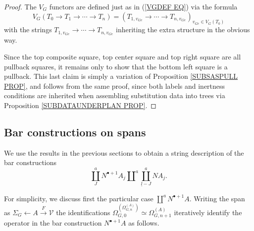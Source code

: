 \documentclass[a4paper,10pt]{article}%
\begin{document}
\begin{proof}
  The $V_G$ functors are defined just as in (\ref{VGDEF EQ}) via the formula
  \[
  V_G(T_0 \to T_1 \to \cdots \to T_n) = 
  (T_{1,v_{Ge}} \to \cdots \to
  T_{n,v_{Ge}})_{v_{Ge} \in V_G(T_0)}\]
  with the strings 
  $T_{1,v_{Ge}} \to \cdots \to T_{n,v_{Ge}}$
  inheriting the extra structure in the obvious way.

  Since the top composite square, top center square and top right square are all pullback squares, it remains only to show that the bottom left square is a pullback.
  This last claim is simply a variation of Proposition \ref{SUBSASPULL PROP}, and follows from the same proof, since both labels and inertness conditions are inherited when assembling substitution data into trees via Proposition \ref{SUBDATAUNDERPLAN PROP}.
\end{proof}


\subsection{Bar constructions on spans}

We use the results in the previous sections to obtain a string description of the bar constructions
\[
\coprod_J^a N^{\bullet +1} A_j \amalg^a
\coprod_{\underline{l}-J}^a N A_j.
\]

For simplicity, we discuss first the particular case 
$\coprod^a N^{\bullet +1} A$. Writing the span as 
$\Sigma_G \leftarrow A \xrightarrow{F} \mathcal{V}$
the identifications 
$\Omega_{G,0}^{\left( \Omega_{G,n}^{(A)} \right)} \simeq \Omega_{G,n+1}^{(A)}$
iteratively identify the operator in the bar construction
$N^{\bullet+1} A$ as follows.
\end{document}
